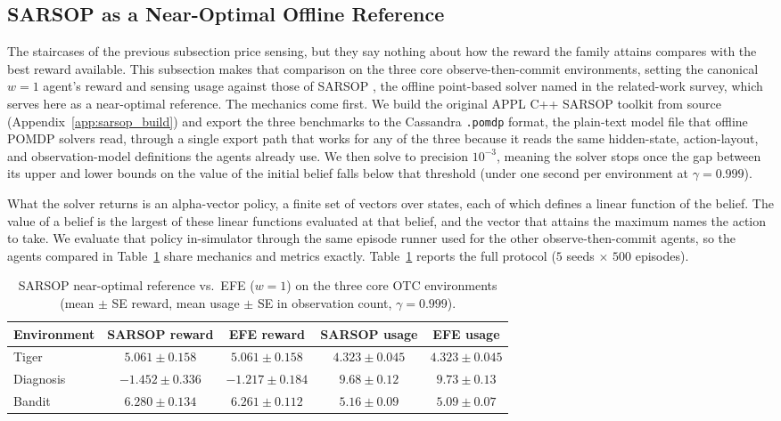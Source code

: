 \subsection{SARSOP as a Near-Optimal Offline Reference}
\label{sec:sarsop}

The staircases of the previous subsection price sensing, but they say nothing about how the reward the family attains compares with the best reward available. This subsection makes that comparison on the three core observe-then-commit environments, setting the canonical $w{=}1$ agent's reward and sensing usage against those of SARSOP \citep{kurniawati2008}, the offline point-based solver named in the related-work survey, which serves here as a near-optimal reference. The mechanics come first. We build the original APPL C++ SARSOP toolkit from source (Appendix~\ref{app:sarsop_build}) and export the three benchmarks to the Cassandra \texttt{.pomdp} format, the plain-text model file that offline POMDP solvers read, through a single export path that works for any of the three because it reads the same hidden-state, action-layout, and observation-model definitions the agents already use. We then solve to precision $10^{-3}$, meaning the solver stops once the gap between its upper and lower bounds on the value of the initial belief falls below that threshold (under one second per environment at $\gamma{=}0.999$).

What the solver returns is an alpha-vector policy, a finite set of vectors over states, each of which defines a linear function of the belief. The value of a belief is the largest of these linear functions evaluated at that belief, and the vector that attains the maximum names the action to take. We evaluate that policy in-simulator through the same episode runner used for the other observe-then-commit agents, so the agents compared in Table~\ref{tab:sarsop} share mechanics and metrics exactly. Table~\ref{tab:sarsop} reports the full protocol ($5$ seeds $\times$ $500$ episodes).

\begin{table}[t]
\centering
\caption{SARSOP near-optimal reference vs.\ EFE ($w{=}1$) on the three core OTC environments (mean $\pm$ SE reward, mean usage $\pm$ SE in observation count, $\gamma{=}0.999$).}
\label{tab:sarsop}
\tablefontsize
\begin{tabular}{lcccc}
\toprule
Environment & SARSOP reward & EFE reward & SARSOP usage & EFE usage \\
\midrule
Tiger & $5.061 \pm 0.158$ & $5.061 \pm 0.158$ & $4.323 \pm 0.045$ & $4.323 \pm 0.045$ \\
Diagnosis & $-1.452 \pm 0.336$ & $-1.217 \pm 0.184$ & $9.68 \pm 0.12$ & $9.73 \pm 0.13$ \\
Bandit & $6.280 \pm 0.134$ & $6.261 \pm 0.112$ & $5.16 \pm 0.09$ & $5.09 \pm 0.07$ \\
\bottomrule
\end{tabular}
\end{table}

